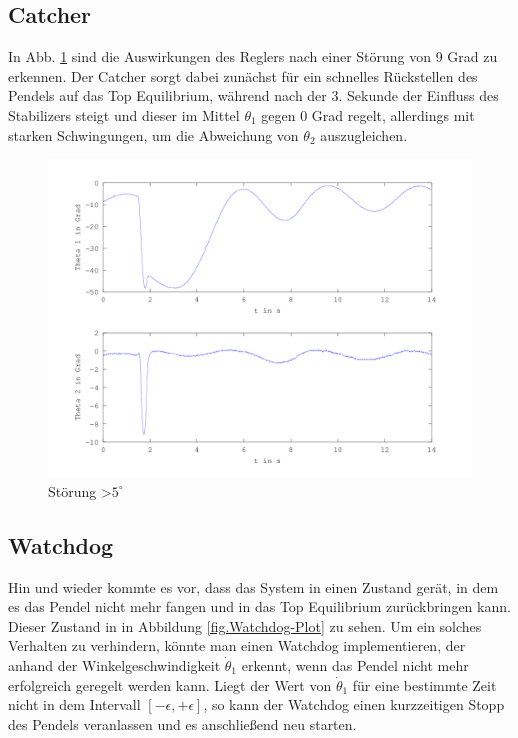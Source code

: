 \subsection{Catcher}
In Abb. \ref{fig.Catcher-Plot} sind die Auswirkungen des Reglers nach einer Störung von 9 Grad zu erkennen. Der Catcher sorgt dabei zunächst für ein schnelles Rückstellen des Pendels auf das Top Equilibrium, während nach der 3. Sekunde der Einfluss des Stabilizers steigt und dieser im Mittel $\theta_1$ gegen 0 Grad regelt, allerdings mit starken Schwingungen, um die Abweichung von $\theta_2$ auszugleichen. 
\begin{figure}[htbp]
	\centering
	\includegraphics[width=1.\textwidth]{Grafiken/Catch_kurz.png}
	\caption{Störung \textgreater $5^{\circ}$}
	\label{fig.Catcher-Plot}
\end{figure}

\subsection{Watchdog}
Hin und wieder kommte es vor, dass das System in einen Zustand gerät, in dem es das Pendel nicht mehr fangen und in das Top Equilibrium zurückbringen kann. Dieser Zustand in in Abbildung \ref{fig.Watchdog-Plot} zu sehen. Um ein solches Verhalten zu verhindern, könnte man einen Watchdog implementieren, der anhand der Winkelgeschwindigkeit $\dot{\theta}_1$ erkennt, wenn das Pendel nicht mehr erfolgreich geregelt werden kann. Liegt der Wert von $\dot{\theta}_1$ für eine bestimmte Zeit nicht in dem Intervall $[-\epsilon,+\epsilon]$, so kann der Watchdog einen kurzzeitigen Stopp des Pendels veranlassen und es anschließend neu starten.

